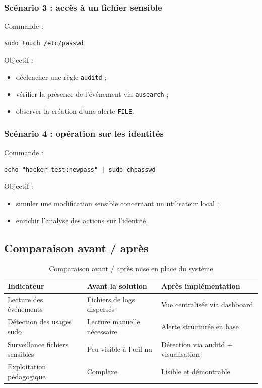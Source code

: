 \documentclass[12pt,a4paper]{article}
\begin{document}
\subsubsection{Scénario 3 : accès à un fichier sensible}

Commande :
\begin{lstlisting}
sudo touch /etc/passwd
\end{lstlisting}

Objectif :
\begin{itemize}
    \item déclencher une règle \texttt{auditd} ;
    \item vérifier la présence de l’événement via \texttt{ausearch} ;
    \item observer la création d’une alerte \texttt{FILE}.
\end{itemize}

\subsubsection{Scénario 4 : opération sur les identités}

Commande :
\begin{lstlisting}
echo "hacker_test:newpass" | sudo chpasswd
\end{lstlisting}

Objectif :
\begin{itemize}
    \item simuler une modification sensible concernant un utilisateur local ;
    \item enrichir l’analyse des actions sur l’identité.
\end{itemize}

\subsection{Comparaison avant / après}

\begin{table}[H]
\centering
\begin{tabular}{@{}p{4.8cm}p{5cm}p{5cm}@{}}
\toprule
\textbf{Indicateur} & \textbf{Avant la solution} & \textbf{Après implémentation} \\
\midrule
Lecture des événements & Fichiers de logs dispersés & Vue centralisée via dashboard \\
Détection des usages sudo & Lecture manuelle nécessaire & Alerte structurée en base \\
Surveillance fichiers sensibles & Peu visible à l’œil nu & Détection via auditd + visualisation \\
Exploitation pédagogique & Complexe & Lisible et démontrable \\
\bottomrule
\end{tabular}
\caption{Comparaison avant / après mise en place du système}
\end{table}
\end{document}
